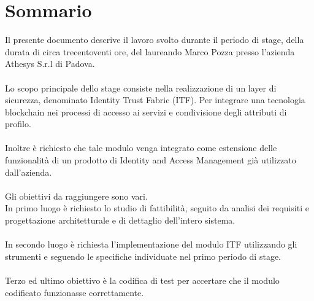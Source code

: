 
\cleardoublepage
{}
{}
\begingroup
\let\clearpage\relax
\let\cleardoublepage\relax
\let\cleardoublepage\relax

\chapter*{Sommario}

Il presente documento descrive il lavoro svolto durante il periodo di stage, della durata di circa trecentoventi ore, del laureando Marco Pozza presso l'azienda Athesys S.r.l di Padova.\\\\
Lo scopo principale dello stage consiste nella realizzazione di un layer di sicurezza, denominato Identity Trust Fabric (ITF). Per integrare una tecnologia blockchain nei processi di accesso ai servizi e condivisione degli attributi di profilo.\\\\
Inoltre è richiesto che tale modulo venga integrato come estensione delle funzionalità di un prodotto di Identity and Access Management già utilizzato dall'azienda.\\\\
Gli obiettivi da raggiungere sono vari.\\
In primo luogo è richiesto lo studio di fattibilità, seguito da analisi dei requisiti e progettazione architetturale e di dettaglio dell'intero sistema.\\\\
In secondo luogo è richiesta l'implementazione del modulo ITF utilizzando gli strumenti e seguendo le specifiche individuate nel primo periodo di stage.\\\\
Terzo ed ultimo obiettivo è la codifica di test per accertare che il modulo codificato funzionasse correttamente.

%
%

\endgroup			

\vfill

